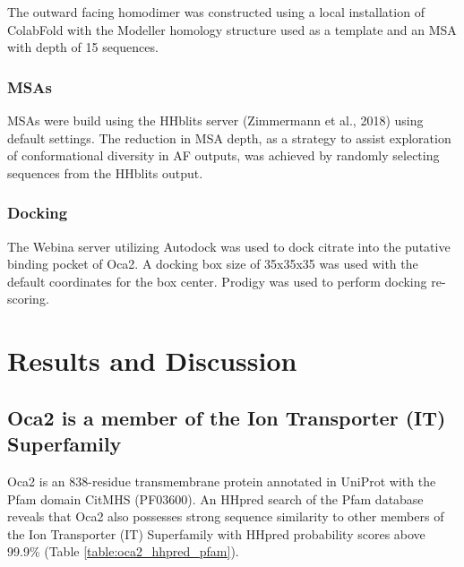 The outward facing homodimer was constructed using a local installation of ColabFold with the Modeller homology structure used as a template and an MSA with depth of 15 sequences.

\subsubsection{MSAs}
MSAs were build using the HHblits server \cite{Zimmermann2018} (Zimmermann et al., 2018) using default settings.  The reduction in MSA depth, as a strategy to assist exploration of conformational diversity in AF outputs, was achieved by randomly selecting sequences from the HHblits output. 

\subsubsection{Docking}
The Webina server \cite{kochnev2020webina} utilizing Autodock \cite{trott2010autodock} was used to dock citrate into the putative binding pocket of Oca2. A docking box size of 35x35x35 was used with the default coordinates for the box center.   Prodigy \cite{xue2016prodigy} was used to perform docking re-scoring.


\section{Results and Discussion}
\subsection{Oca2 is a member of the Ion Transporter (IT) Superfamily}

Oca2 is an 838-residue transmembrane protein annotated in UniProt with the Pfam domain CitMHS (PF03600).  An HHpred search of the Pfam database reveals that Oca2 also possesses strong sequence similarity to other members of the Ion Transporter (IT) Superfamily with HHpred probability scores above 99.9\% (Table \ref{table:oca2_hhpred_pfam}).


